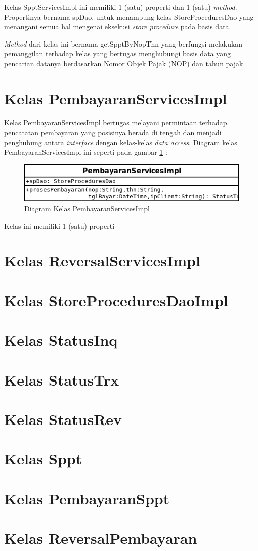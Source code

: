 Kelas SpptServicesImpl ini memiliki 1 (satu) properti dan 1 (satu) \textit{method}. Propertinya bernama spDao, untuk menampung kelas StoreProceduresDao yang menangani semua hal mengenai eksekusi \textit{store procedure} pada basis data.

\textit{Method} dari kelas ini bernama getSpptByNopThn yang berfungsi melakukan pemanggilan terhadap kelas yang bertugas menghubungi basis data yang pencarian datanya berdasarkan Nomor Objek Pajak (NOP) dan tahun pajak.

\section{Kelas PembayaranServicesImpl}

Kelas PembayaranServicesImpl bertugas melayani permintaan terhadap pencatatan pembayaran yang posisinya berada di tengah dan menjadi penghubung antara \textit{interface} dengan kelas-kelas \textit{data access}. Diagram kelas PembayaranServicesImpl ini seperti pada gambar \ref{fig:uml-class-PembayaranServicesImpl} :

\begin{figure}[H]
  \centering
  \includegraphics[width=1\textwidth]{./resources/uml/uml-class-PembayaranServicesImpl}
  \caption{Diagram Kelas PembayaranServicesImpl}
  \label{fig:uml-class-PembayaranServicesImpl}
\end{figure}

Kelas ini memiliki 1 (satu) properti 

\section{Kelas ReversalServicesImpl}

\section{Kelas StoreProceduresDaoImpl}

\section{Kelas StatusInq}

\section{Kelas StatusTrx}

\section{Kelas StatusRev}

\section{Kelas Sppt}

\section{Kelas PembayaranSppt}

\section{Kelas ReversalPembayaran}
